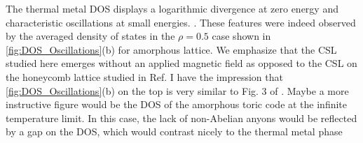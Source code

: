 \documentclass[%
 reprint,
superscriptaddress,
 amsmath,amssymb,
aps,
]{revtex4-2}
\begin{document}
The thermal metal DOS displays a logarithmic divergence at zero energy and characteristic oscillations at small energies. \cite{bocquet_disordered_2000, selfThermallyInducedMetallic2019}. These features were indeed observed by the averaged density of states in the $\rho = 0.5$ case shown in \cref{fig:DOS_Oscillations}(b) for amorphous lattice. We emphasize that the CSL studied here emerges without an applied magnetic field as opposed to the CSL on the honeycomb lattice studied in Ref. \cite{selfThermallyInducedMetallic2019} {\color{red} I have the impression that \cref{fig:DOS_Oscillations}(b) on the top is very similar to Fig. 3 of \cite{selfThermallyInducedMetallic2019}. Maybe a more instructive figure would be the DOS of the amorphous toric code at the infinite temperature limit. In this case, the lack of non-Abelian anyons would be reflected by a gap on the DOS, which would contrast nicely to the thermal metal phase} \par

\end{document}
